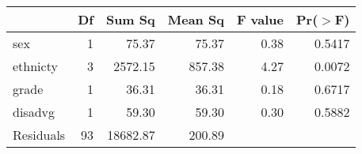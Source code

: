 \documentclass[landscape,final,a0paper,fontscale=0.285]{baposter}
\begin{document}
\begin{poster}
{%
\begin{minipage}{\linewidth}
\centering
\begin{tabular}{lrrrrr}
  \hline
 & Df & Sum Sq & Mean Sq & F value & Pr($>$F) \\ 
  \hline
sex & 1 & 75.37 & 75.37 & 0.38 & 0.5417 \\ 
  ethnicty & 3 & 2572.15 & 857.38 & 4.27 & 0.0072 \\ 
  grade & 1 & 36.31 & 36.31 & 0.18 & 0.6717 \\ 
  disadvg & 1 & 59.30 & 59.30 & 0.30 & 0.5882 \\ 
  Residuals & 93 & 18682.87 & 200.89 &  &  \\ 
   \hline
\end{tabular}
\end{minipage}
}
    


\end{poster}
\end{document}
